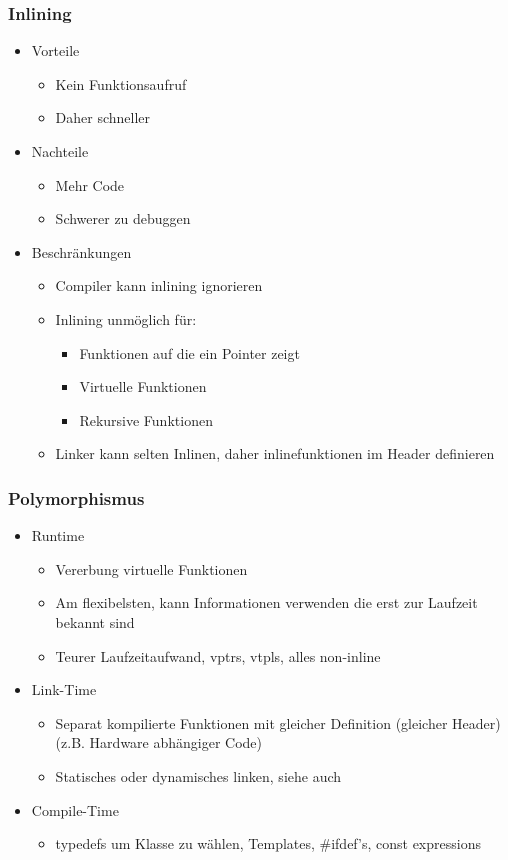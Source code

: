 \subsubsection{Inlining}
\begin{itemize}
	\item Vorteile
		\begin{itemize}
			\item Kein Funktionsaufruf
			\item Daher schneller
		\end{itemize}
	\item Nachteile
		\begin{itemize}
			\item Mehr Code
			\item Schwerer zu debuggen
		\end{itemize}
	\item Beschränkungen
		\begin{itemize}
			\item Compiler kann inlining ignorieren
			\item Inlining unmöglich für:
				\begin{itemize}
					\item Funktionen auf die ein Pointer zeigt
					\item Virtuelle Funktionen
					\item Rekursive Funktionen
				\end{itemize}
			\item Linker kann selten Inlinen, daher inlinefunktionen im Header definieren
		\end{itemize}
\end{itemize}

\subsubsection{Polymorphismus}
\begin{itemize}
	\item Runtime
		\begin{itemize}
			\item Vererbung virtuelle Funktionen
			\item Am flexibelsten, kann Informationen verwenden die erst zur Laufzeit bekannt sind
			\item Teurer Laufzeitaufwand, vptrs, vtpls, alles non-inline
		\end{itemize}
	\item Link-Time
		\begin{itemize}
			\item Separat kompilierte Funktionen mit gleicher Definition (gleicher Header) (z.B.
				Hardware abhängiger Code)
			\item Statisches oder dynamisches linken, siehe auch 
		\end{itemize}
	\item Compile-Time
		\begin{itemize}
			\item typedefs um Klasse zu wählen, Templates, \#ifdef's, const expressions
		\end{itemize}
\end{itemize}

